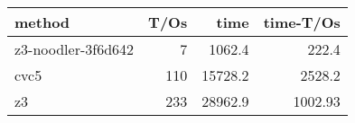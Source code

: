 \begin{tabular}{lrrr}
\hline
 method             &   T/Os &    time &   time-T/Os \\
\hline
 z3-noodler-3f6d642 &      7 &  1062.4 &      222.4  \\
 cvc5               &    110 & 15728.2 &     2528.2  \\
 z3                 &    233 & 28962.9 &     1002.93 \\
\hline
\end{tabular}
